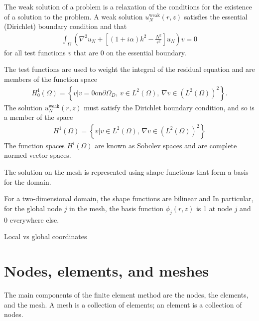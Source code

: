 The weak solution of a problem is a relaxation of the conditions for the existence of a solution to the problem.
A weak solution $u_N^{\mathrm{weak}}(r,z)$ satisfies the essential (Dirichlet) boundary condition and that
\begin{align}
	\int_\Omega \left( \nabla^2 u_N + \left[ (1+i\alpha)k^2-\frac{N^2}{r^2}\right]u_N \right) v = 0
\end{align}
for all test functions $v$ that are 0 on the essential boundary.

The test functions are used to weight the integral of the residual equation and are members of the function space
\begin{align}
	H^1_0(\Omega) = \left\{ v | v=0 \mathrm{on} \partial\Omega_D, \, v \in L^2(\Omega), \, \nabla v \in (L^2(\Omega))^2 \right\}.
\end{align}
The solution $u_N^{\mathrm{weak}}(r,z)$ must satisfy the Dirichlet boundary condition, and so is a member of the space
\begin{align}
	H^1(\Omega) = \left\{ v | v \in L^2(\Omega), \, \nabla v \in (L^2(\Omega))^2 \right\}
\end{align}
The function spaces $H^i(\Omega)$ are known as Sobolev spaces and are complete normed vector spaces.




The solution on the mesh is represented using shape functions that form a basis for the domain.

For a two-dimensional domain, the shape functions are bilinear and 
In particular, for the global node $j$ in the mesh, the basis function $\phi_j(r,z)$ is 1 at node $j$ and 0 everywhere else.


Local vs global coordinates





\section{Nodes, elements, and meshes}

The main components of the finite element method are the nodes, the elements, and the mesh.
A mesh is a collection of elements; an element is a collection of nodes.

